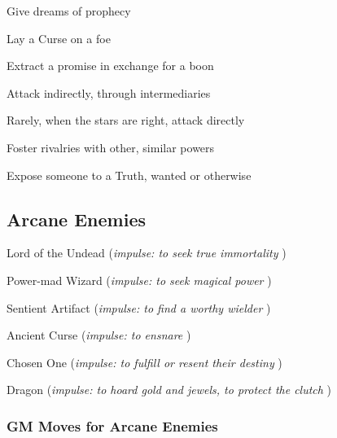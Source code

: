  
\item Give dreams of prophecy

 
\item Lay a Curse on a foe

 
\item Extract a promise in exchange for a boon

 
\item Attack indirectly, through intermediaries

 
\item Rarely, when the stars are right, attack directly

 
\item Foster rivalries with other, similar powers

 
\item Expose someone to a Truth, wanted or otherwise


\stopitemize
 
\subsection{Arcane Enemies}    
 
\startitemize[1,packed]

\item Lord of the Undead ({\em impulse: to seek true immortality} )

 
\item Power-mad Wizard ({\em impulse: to seek magical power} )

 
\item Sentient Artifact ({\em impulse: to find a worthy wielder} )

 
\item Ancient Curse ({\em impulse: to ensnare} )

 
\item Chosen One ({\em impulse: to fulfill or resent their destiny} )

 
\item Dragon ({\em impulse: to hoard gold and jewels, to protect the clutch} )


\stopitemize
 
\subsubsection{GM Moves for Arcane Enemies}      
 
\startitemize[1,packed]

